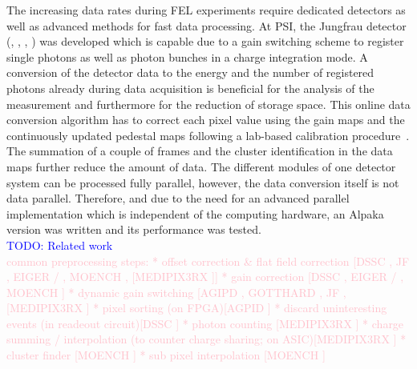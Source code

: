 \documentclass[a4paper]{article}
\begin{document}
The increasing data rates during FEL experiments require dedicated detectors as well as advanced methods for fast data processing.
At PSI, the Jungfrau detector (\cite{JFapplications}, \cite{JFcalibration}, \cite{JFoperation}, \cite{Mozzanica_2016}) was developed which is capable due to a gain switching scheme to register single photons as well as photon bunches in a charge integration mode. A conversion of the detector data to the energy and the number of registered photons already during data acquisition is beneficial for the analysis of the measurement and furthermore for the reduction of storage space. This online data conversion algorithm has to correct each pixel value using the gain maps and the continuously updated pedestal maps following a lab-based calibration  procedure~\cite{JFcalibration}. The summation of a couple of frames and the cluster identification in the data maps further reduce the amount of data. The different modules of one detector system can be processed fully parallel, however, the data conversion itself is not data parallel. Therefore, and due to the need for an advanced parallel implementation which is independent of the computing hardware, an Alpaka \cite{Matthes17} version was written and its performance was tested.\\

\textcolor{blue}{TODO: Related work}\\
\textcolor{pink}{
common preprocessing steps:
 * offset correction \& flat field correction [DSSC \cite{moch2014calibration}, JF \cite{JFcalibration}, EIGER\cite{tinti2018electron} / \cite{dinapoli2013eiger}, MOENCH \cite{cartier2016micrometer}, [MEDIPIX3RX \cite{ballabriga2013medipix3rx}]]
 * gain correction [DSSC \cite{moch2014calibration}, EIGER \cite{tinti2018electron} / \cite{dinapoli2013eiger}, MOENCH \cite{cartier2016micrometer}]
 * dynamic gain switching [AGIPD \cite{allahgholi2015agipd}, GOTTHARD \cite{mozzanica2012gotthard}, JF \cite{JFcalibration}, [MEDIPIX3RX \cite{ballabriga2013medipix3rx}]
 * pixel sorting (on FPGA)[AGPID \cite{becker2013high}]
 * discard uninteresting events (in readeout circuit)[DSSC \cite{erdinger2012dssc}]
 * photon counting [MEDIPIX3RX \cite{ballabriga2013medipix3rx}]
 * charge summing / interpolation (to counter charge sharing; on ASIC)[MEDIPIX3RX \cite{ballabriga2013medipix3rx}]
 * cluster finder [MOENCH \cite{cartier2016micrometer}]
 * sub pixel interpolation [MOENCH \cite{cartier2016micrometer}]}\\
\end{document}
